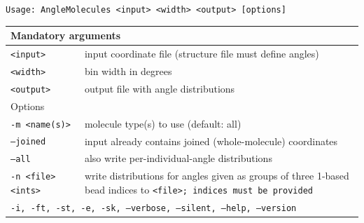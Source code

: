 \noindent
\tt{Usage: AngleMolecules <input> <width> <output> [options]}

\noindent
\begin{longtable}{p{}p{}}
  \toprule
  \multicolumn{2}{l}{Mandatory arguments} \\
  \midrule
  \tt{<input>}  & input coordinate file (structure file must define angles) \\
  \tt{<width>}  & bin width in degrees \\
  \tt{<output>} & output file with angle distributions \\
  \toprule
  \multicolumn{2}{l}{Options} \\
  \midrule
  \tt{-m <name(s)>}     & molecule type(s) to use (default: all) \\
  \tt{--joined}         & input already contains joined (whole-molecule)
                          coordinates \\
  \tt{--all}            & also write per-individual-angle distributions \\
  \tt{-n <file> <ints>} & write distributions for angles given as groups of
                          three 1-based bead indices to \tt{<file>}; indices
                          must be provided \\
  \midrule
  \multicolumn{2}{p{0.948\textwidth}}{\tt{-i}, \tt{-ft}, \tt{-st}, \tt{-e},
    \tt{-sk}, \tt{--verbose}, \tt{--silent}, \tt{--help}, \tt{--version}} \\
  \bottomrule
\end{longtable}

